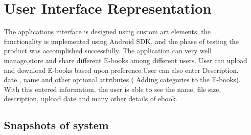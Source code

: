 \section{User Interface Representation}

The applications interface is designed using custom art elements, the functionality is implemented using Android SDK, and the phase of testing the product was accomplished successfully. The application can very well manage,store and share different E-books among different users. User can upload and download E-books based upon preference.User can also enter
Description, date , name  and other optional attributes ( Adding categories  to the E-books). With this entered information, the user is able to see the name, file size, description, upload date and many other details of ebook.


\subsection{Snapshots of system}


